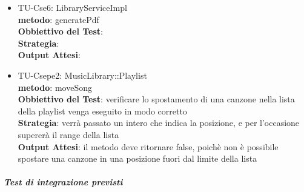 \begin{itemize}
\item TU-Cse6: LibraryServiceImpl\\
\textbf{metodo}: generatePdf\\
\textbf{Obbiettivo del Test}: \\
\textbf{Strategia}:\\
\textbf{Output Attesi}: \\

\item TU-Csepe2: MusicLibrary::Playlist\\
\textbf{metodo}: moveSong\\
\textbf{Obbiettivo del Test}: verificare lo spostamento di una canzone nella
lista della playlist venga eseguito in modo corretto\\
\textbf{Strategia}: verr\`a passato un intero che indica la posizione, e per
l'occasione superer\`a il range della lista\\
\textbf{Output Attesi}: il metodo deve ritornare false, poich\`e non \`e
possibile spostare una canzone in una posizione fuori dal limite della lista\\



\end{itemize}

\subparagraph{Test di integrazione previsti}

